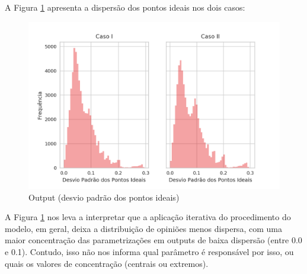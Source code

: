 A Figura \ref{fig:Yshist} apresenta a dispersão dos pontos ideais nos dois casos:
\begin{figure}[H]
  \centering
  \includegraphics{ims/distYs.png}
  \caption{Output (desvio padrão dos pontos ideais) }
  \label{fig:Yshist}
\end{figure}

A Figura \ref{fig:Yshist}  nos leva a interpretar  que a aplicação iterativa do
procedimento do modelo, em geral, deixa a distribuição de opiniões menos
dispersa, com uma maior concentração das parametrizações em outputs de baixa
dispersão (entre 0.0 e 0.1). Contudo, isso não nos informa qual parâmetro é
responsável por isso, ou quais os valores de concentração (centrais ou extremos).



